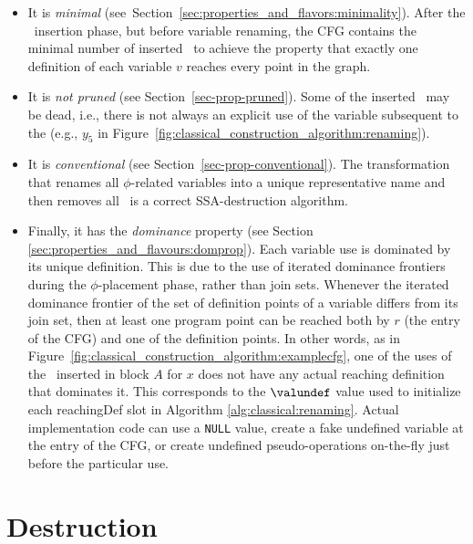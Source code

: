 {\begin{itemize}
\item It is \textit{minimal} (see~Section~\ref{sec:properties_and_flavors:minimality}).
After the \phifun\ insertion phase,
but before variable renaming, the CFG contains the minimal 
number of inserted \phifuns\ to achieve the property that exactly
one definition of each variable $v$ reaches every point in the graph.
\item It is \textit{not pruned} (see Section~\ref{sec-prop-pruned}).
Some of the inserted \phifuns\
may be dead, i.e., there is not always an explicit use of the variable subsequent
to the \phifun (e.g., $y_5$ in Figure~\ref{fig:classical_construction_algorithm:renaming}).
\item It is \textit{conventional} (see Section~\ref{sec-prop-conventional}).
The transformation that renames all $\phi$-related variables into a
unique representative name and then removes all \phifuns\ is a correct SSA-destruction algorithm.
\item Finally, it has the \textit{dominance} property (see Section
\ref{sec:properties_and_flavours:domprop}).\index{strict SSA form}
Each variable use is dominated by its unique definition. 
This is due to the use of iterated dominance frontiers
during the $\phi$-placement phase,
rather than join sets. Whenever the iterated dominance frontier
of the set of definition points of a variable differs from its join
set, then at least one program point can be reached both by $r$ (the
entry of the CFG) and one of the definition points. In other words, as
in Figure~\ref{fig:classical_construction_algorithm:examplecfg}, one
of the uses of the \phifun\ inserted in block $A$ for $x$ does not have
any actual reaching definition that dominates it. This corresponds to
the $\valundef$ value used to initialize each reachingDef slot in Algorithm
\ref{alg:classical:renaming}.
Actual implementation code can use a \texttt{NULL} value, create a
fake undefined variable at the entry of the CFG, or create
undefined pseudo-operations on-the-fly just before the particular use.
\end{itemize}


\section{Destruction}
\label{sec:classical_construction_algorithm:destruction}

}
